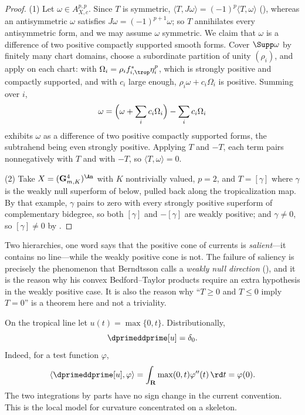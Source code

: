 \begin{proof}
(1)  Let $\omega\in A_{X,c}^{p,p}$.  Since $T$ is symmetric,
$\langle T,J\omega\rangle=(-1)^p\langle T,\omega\rangle$
(), whereas an antisymmetric $\omega$
satisfies $J\omega=(-1)^{p+1}\omega$; so $T$ annihilates every antisymmetric
form, and we may assume $\omega$ symmetric.  We claim that
$\omega$ is a difference of two positive compactly supported smooth forms.
Cover $\Supp\omega$ by finitely many chart domains, choose a subordinate
partition of unity $(\rho_i)$, and apply
 on each chart: with
$\Omega_i=\rho_if_{i,\trop}^*\eta_i^{p}$, which is strongly positive and
compactly supported, and with $c_i$ large enough,
$\rho_i\omega+c_i\Omega_i$ is positive.  Summing over $i$,
\[
 \omega=\Bigl(\omega+\sum_ic_i\Omega_i\Bigr)-\sum_ic_i\Omega_i
\]
exhibits $\omega$ as a difference of two positive compactly supported forms,
the subtrahend being even strongly positive.  Applying $T$ and $-T$, each term pairs
nonnegatively with $T$ and with $-T$, so $\langle T,\omega\rangle=0$.

(2)  Take $X=(\mathbf G_{m,K}^4)^{\An}$ with $K$ nontrivially valued,
$p=2$, and $T=[\gamma]$ where $\gamma$ is the weakly null superform of
 below, pulled back along the tropicalization map.
By that example, $\gamma$ pairs to zero with every strongly positive
superform of complementary bidegree, so both $[\gamma]$ and $-[\gamma]$ are
weakly positive; and $\gamma\neq0$, so $[\gamma]\neq0$ by
.
\end{proof}

\begin{warning}{Two hierarchies, one word}
 says that the positive cone of
currents is \emph{salient}---it contains no line---while the weakly positive
cone is not.  The failure of saliency is precisely the phenomenon that
Berndtsson calls a \emph{weakly null direction}
(), and it is the reason why his convex
Bedford--Taylor products require an extra hypothesis in the weakly positive
case.  It is also the reason why ``$T\ge0$ and $T\le0$ imply $T=0$'' is a
theorem here and not a triviality.
\end{warning}

\begin{example}
\label{ex:ch14-convex-corner-restated}
On the tropical line let $u(t)=\max\{0,t\}$.  Distributionally,
\[
                     \dprimeddprime[u]=\delta_0.
\]
Indeed, for a test function $\varphi$,
\[
 \langle\dprimeddprime[u],\varphi\rangle
 =\int_{\mathbf R}\max(0,t)\varphi''(t)\,\rd t=\varphi(0).
\]
The two integrations by parts have no sign change in the current convention.
This is the local model for curvature concentrated on a skeleton.
\end{example}


